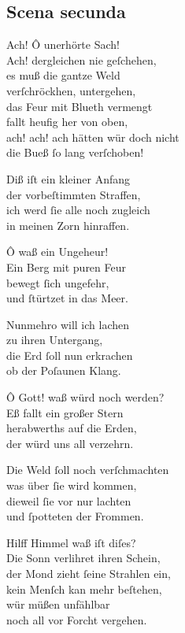 \documentclass{ees}
\newenvironment{lyrics}[1]{%
  \subsection{#1}\nopagebreak%
  \begin{lyricslist}%
  \let\voice\item%
}{%
  \end{lyricslist}%
}
\begin{document}
\begin{lyrics}{Scena secunda}
  \voice[Chorus]
  Ach! Ô unerhörte Sach!\\
  Ach! dergleichen nie geſchehen,\\
  es muß die gantze Weld\\
  verſchröckhen, untergehen,\\
  das Feur mit Blueth vermengt\\
  fallt heufig her von oben,\\
  ach! ach! ach hätten wür doch nicht\\
  die Bueß ſo lang verſchoben!

  \voice[Judex]
  Diß iſt ein kleiner Anfang\\
  der vorbeſtimmten Straffen,\\
  ich werd ſie alle noch zugleich\\
  in meinen Zorn hinraffen.

  \voice[Chorus]
  Ô waß ein Ungeheur!\\
  Ein Berg mit puren Feur\\
  bewegt ſich ungefehr,\\
  und ſtürtzet in das Meer.

  \voice[Judex]
  Nunmehro will ich lachen\\
  zu ihren Untergang,\\
  die Erd ſoll nun erkrachen\\
  ob der Poſaunen Klang.

  \voice[Chorus]
  Ô Gott! waß würd noch werden?\\
  Eß fallt ein großer Stern\\
  herabwerths auf die Erden,\\
  der würd uns all verzehrn.

  \voice[Judex]
  Die Weld ſoll noch verſchmachten\\
  was über ſie wird kommen,\\
  dieweil ſie vor nur lachten\\
  und ſpotteten der Frommen.

  \voice[Chorus]
  Hilff Himmel waß iſt diſes?\\
  Die Sonn verlihret ihren Schein,\\
  der Mond zieht ſeine Strahlen ein,\\
  kein Menſch kan mehr beſtehen,\\
  wür müßen unfählbar\\
  noch all vor Forcht vergehen.


\end{lyrics}
\end{document}
